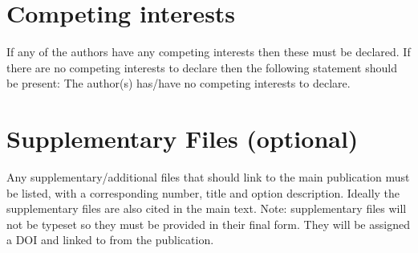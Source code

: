\documentclass{article}
\begin{document}
\section*{Competing interests} 
If any of the authors have any competing interests then these must be declared. If there are no competing interests to declare then the following statement should be present: The author(s) has/have no competing interests to declare.




\section*{Supplementary Files (optional)}
Any supplementary/additional files that should link to the main publication must be listed, with a corresponding number, title and option description. Ideally the supplementary files are also cited in the main text.
Note: supplementary files will not be typeset so they must be provided in their final form. They will be assigned a DOI and linked to from the publication.
\end{document}

